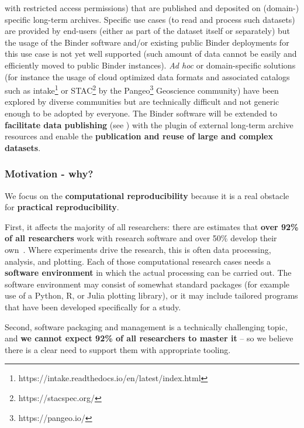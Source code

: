 \begin{compactitem}
      with restricted access permissions) that are published and deposited on (domain-) specific long-term archives.
      Specific use cases (to read and process such datasets) are provided by end-users (either as part of the dataset
      itself or separately) but the usage of the Binder software and/or existing public Binder deployments for
      this use case is not yet well supported (such amount of data cannot be easily and efficiently moved to
      public Binder instances).
      \emph{Ad hoc} or domain-specific solutions (for instance the usage of cloud optimized
      data formats and associated catalogs such as intake\footnote{https://intake.readthedocs.io/en/latest/index.html}
      or STAC\footnote{https://stacspec.org/} by the Pangeo\footnote{https://pangeo.io/} Geoscience community)
      have been explored by diverse communities but are technically difficult and not generic enough to be
      adopted by everyone. The Binder software will be extended to \textbf{facilitate data publishing} (see ) with
      the plugin of external long-term archive resources and enable the \textbf{publication and reuse of large and complex datasets}.
\end{compactitem}


\subsubsection{Motivation - why?}\label{sec:motivation-why}

We focus on the \textbf{computational reproducibility} because it is a real
obstacle for \textbf{practical reproducibility}.

First, it affects the majority of all researchers: there are estimates that \textbf{over
92\% of all researchers} work with research software and over 50\% develop
their own~\cite{Hettrick2014}. Where experiments drive the research, this is
often data processing, analysis, and plotting. Each of those computational
research cases needs a \textbf{software environment} in which the actual processing can
be carried out. The software environment may consist of somewhat standard
packages (for example use of a Python, R, or Julia plotting library), or it may
include tailored programs that have been developed specifically for a study.

Second, software packaging and management is a technically challenging topic,
and \textbf{we cannot expect 92\% of all researchers to master it} -- so we believe there
is a clear need to support them with appropriate tooling.

